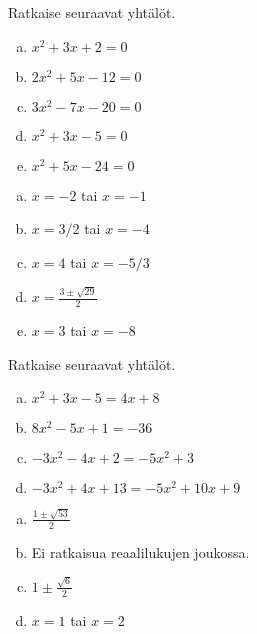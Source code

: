 \begin{tehtava}
    Ratkaise seuraavat yhtälöt.
    \begin{enumerate}[a)]
        \item $x^2+3x+2=0$
        \item $2x^2+5x-12=0$
        \item $3x^2-7x-20=0$
        \item $x^2+3x-5=0$
        \item $x^2+5x-24=0$
    \end{enumerate}
    \begin{vastaus}
        \begin{enumerate}[a)]
            \item $x=-2$ tai $x=-1$
            \item $x=3/2$ tai $x=-4$
            \item $x=4$ tai $x=-5/3$
            \item $x=\frac{3\pm\sqrt{29}}{2}$
            \item $x=3$ tai $x=-8$
        \end{enumerate}
    \end{vastaus}
\end{tehtava}

\begin{tehtava}
    Ratkaise seuraavat yhtälöt.
    \begin{enumerate}[a)]
        \item $x^2+3x-5=4x+8$
        \item $8x^2-5x+1=-36$
        \item $-3x^2-4x+2=-5x^2+3$
        \item $-3x^2+4x+13=-5x^2+10x+9$
    \end{enumerate}
    \begin{vastaus}
        \begin{enumerate}[a)]
            \item $\frac{1\pm\sqrt{53}}{2}$
            \item Ei ratkaisua reaalilukujen joukossa.
            \item $1\pm\frac{\sqrt{6}}{2}$
            \item $x=1$ tai $x=2$
        \end{enumerate}
    \end{vastaus}
\end{tehtava}

